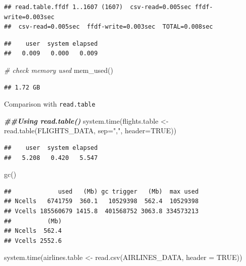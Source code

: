 \documentclass[
  12pt,
]{style/krantz}
\newenvironment{Shaded}{\begin{snugshade}}{\end{snugshade}}
\newcommand{\AttributeTok}[1]{\textcolor[rgb]{0.77,0.63,0.00}{#1}}
\newcommand{\CommentTok}[1]{\textcolor[rgb]{0.56,0.35,0.01}{\textit{#1}}}
\newcommand{\ConstantTok}[1]{\textcolor[rgb]{0.00,0.00,0.00}{#1}}
\newcommand{\DocumentationTok}[1]{\textcolor[rgb]{0.56,0.35,0.01}{\textbf{\textit{#1}}}}
\newcommand{\FunctionTok}[1]{\textcolor[rgb]{0.00,0.00,0.00}{#1}}
\newcommand{\NormalTok}[1]{#1}
\newcommand{\OtherTok}[1]{\textcolor[rgb]{0.56,0.35,0.01}{#1}}
\newcommand{\StringTok}[1]{\textcolor[rgb]{0.31,0.60,0.02}{#1}}
\begin{document}
\begin{verbatim}
## read.table.ffdf 1..1607 (1607)  csv-read=0.005sec ffdf-write=0.003sec
##  csv-read=0.005sec  ffdf-write=0.003sec  TOTAL=0.008sec
\end{verbatim}

\begin{verbatim}
##    user  system elapsed 
##   0.009   0.000   0.009
\end{verbatim}

\begin{Shaded}
\begin{Highlighting}[]
\CommentTok{\# check memory used}
\FunctionTok{mem\_used}\NormalTok{()}
\end{Highlighting}
\end{Shaded}

\begin{verbatim}
## 1.72 GB
\end{verbatim}

Comparison with \texttt{read.table}

\begin{Shaded}
\begin{Highlighting}[]
\DocumentationTok{\#\#Using read.table()}
\FunctionTok{system.time}\NormalTok{(flights.table }\OtherTok{\textless{}{-}} \FunctionTok{read.table}\NormalTok{(FLIGHTS\_DATA, }
                                        \AttributeTok{sep=}\StringTok{","}\NormalTok{,}
                                        \AttributeTok{header=}\ConstantTok{TRUE}\NormalTok{))}
\end{Highlighting}
\end{Shaded}

\begin{verbatim}
##    user  system elapsed 
##   5.208   0.420   5.547
\end{verbatim}

\begin{Shaded}
\begin{Highlighting}[]
\FunctionTok{gc}\NormalTok{()}
\end{Highlighting}
\end{Shaded}

\begin{verbatim}
##             used   (Mb) gc trigger   (Mb)  max used
## Ncells   6741759  360.1   10529398  562.4  10529398
## Vcells 185560679 1415.8  401568752 3063.8 334573213
##          (Mb)
## Ncells  562.4
## Vcells 2552.6
\end{verbatim}

\begin{Shaded}
\begin{Highlighting}[]
\FunctionTok{system.time}\NormalTok{(airlines.table }\OtherTok{\textless{}{-}} \FunctionTok{read.csv}\NormalTok{(AIRLINES\_DATA,}
                                       \AttributeTok{header =} \ConstantTok{TRUE}\NormalTok{))}
\end{Highlighting}
\end{Shaded}
\end{document}
